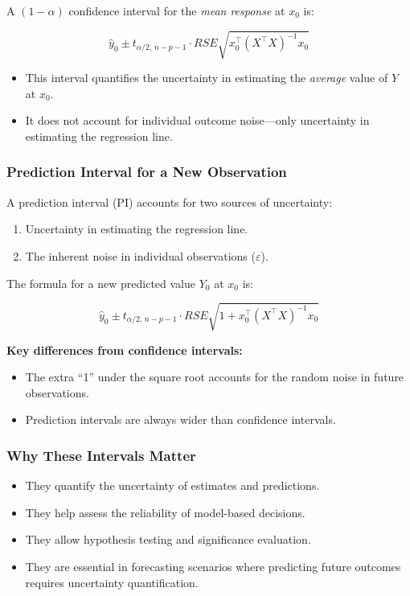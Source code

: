 \documentclass[11pt,a4paper]{article}
\begin{document}
A $(1-\alpha)$ confidence interval for the \emph{mean response} at $x_0$ is:

\[
\hat{y}_0 \pm t_{\alpha/2,\, n-p-1} \cdot 
RSE \sqrt{x_0^\top (X^\top X)^{-1} x_0}
\]

\begin{itemize}
    \item This interval quantifies the uncertainty in estimating the \emph{average} value of $Y$ at $x_0$.
    \item It does not account for individual outcome noise—only uncertainty in estimating the regression line.
\end{itemize}

\subsubsection{Prediction Interval for a New Observation}

A prediction interval (PI) accounts for two sources of uncertainty:

\begin{enumerate}
    \item Uncertainty in estimating the regression line.
    \item The inherent noise in individual observations ($\varepsilon$).
\end{enumerate}

The formula for a new predicted value $Y_0$ at $x_0$ is:

\[
\hat{y}_0 \pm t_{\alpha/2,\, n-p-1} \cdot 
RSE \sqrt{1 + x_0^\top (X^\top X)^{-1} x_0}
\]

\textbf{Key differences from confidence intervals:}

\begin{itemize}
    \item The extra ``1'' under the square root accounts for the random noise in future observations.
    \item Prediction intervals are always wider than confidence intervals.
\end{itemize}

\subsubsection{Why These Intervals Matter}

\begin{itemize}
    \item They quantify the uncertainty of estimates and predictions.
    \item They help assess the reliability of model-based decisions.
    \item They allow hypothesis testing and significance evaluation.
    \item They are essential in forecasting scenarios where predicting future outcomes requires uncertainty quantification.
\end{itemize}
\end{document}
